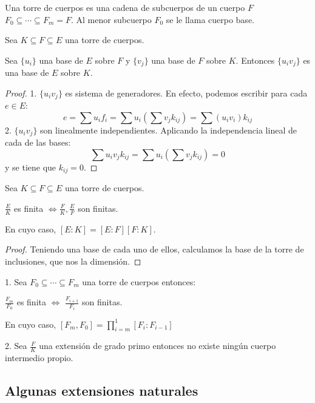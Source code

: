 \begin{definition}
	Una torre de cuerpos es una cadena de subcuerpos de un cuerpo $F$ $F_0 \subseteq \cdots \subseteq F_m = F$. Al menor subcuerpo $F_0$ se le llama cuerpo base. 
\end{definition}

\begin{lemma}
	Sea $K \subseteq F \subseteq E$ una torre de cuerpos. 
	
	Sea $\{u_i\}$ una base de $E$ sobre $F$ y $\{v_j\}$ una base de $F$ sobre $K$. Entonces $\{u_iv_j\}$  es una base de $E$ sobre $K$. 
\end{lemma}
\begin{proof}
	1. $\{u_iv_j\}$ es sistema de generadores. En efecto, podemos escribir para cada $e \in E$: $$e = \sum u_if_i = \sum u_i (\sum v_jk_{ij}) =  \sum (u_iv_i)k_{ij}$$
	2. $\{u_iv_j\}$ son linealmente independientes. Aplicando la independencia lineal de cada de las bases: $$\sum u_iv_jk_{ij} = \sum u_i (\sum v_jk_{ij}) = 0$$ y se tiene que $k_{ij} = 0$. 
\end{proof}

\begin{proposition}
	Sea $K \subseteq F \subseteq E$ una torre de cuerpos. 
	
	$\frac{E}{K}$ es finita $\iff \frac{F}{K},\frac{E}{F}$ son finitas. 
	
	En cuyo caso, $[E:K] = [E:F][F:K]$.	
\end{proposition}
\begin{proof}
	Teniendo una base de cada uno de ellos, calculamos la base de la torre de inclusiones, que nos la dimensión. 
\end{proof}

\begin{corollary}
1. Sea $F_0 \subseteq \cdots \subseteq F_m$ una torre de cuerpos entonces:

$\frac{F_m}{F_0}$ es finita $\iff$ $\frac{F_{i+1}}{F_i}$ son finitas.

En cuyo caso, $[F_m,F_0] = \prod_{i = m}^{1} [F_i:F_{i-1}]$ 

2. Sea $\frac{F}{K}$ una extensión de grado primo entonces no existe ningún cuerpo intermedio propio. 
\end{corollary}

\subsection{Algunas extensiones naturales}

